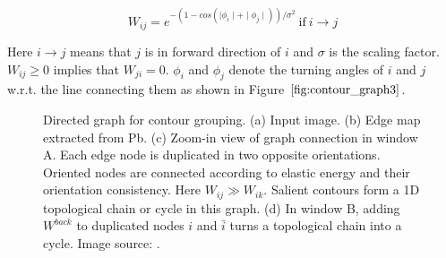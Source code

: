 \documentclass{SMBV13}
\begin{document}
\begin{equation}
W_{ij} = e^{-(1 - cos(\mid \phi_i \mid + \mid \phi_j \mid))/\sigma^2}\ \mathrm{if}\ i \rightarrow j
\end{equation}

Here $i \rightarrow j$ means that $j$ is in forward direction of $i$ and $\sigma$ is the scaling factor. $W_{ij} \geq 0$ implies that $W_{ji} = 0$. $\phi_i$ and $\phi_j$ denote the turning angles of $i$ and $j$ w.r.t. the line connecting them as shown in Figure $\ref{fig:contour_graph3}$.

\begin{figure}[htbp]
    \centering
    \caption{Directed graph for contour grouping. (a) Input image. (b) Edge map extracted from Pb. (c) Zoom-in view of graph connection in window A. Each edge node is duplicated in two opposite orientations. Oriented nodes are connected according to elastic energy and their orientation consistency. Here $W_{ij} \gg W_{ik}$. Salient contours form a 1D topological chain or cycle in this graph. (d) In window B, adding $W^{back}$ to duplicated nodes $i$ and $\bar{i}$ turns a topological chain into a cycle. Image source: \cite{zhu2007untangling}.}
\end{figure}
\end{document}
